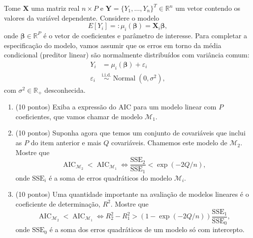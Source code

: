 \documentclass[a4paper,10pt, notitlepage]{report}
\newif\ifanswers
\begin{document}
Tome $ \boldsymbol{X}$ uma matriz real $n \times P$ e $\boldsymbol{Y} = \{Y_1, \ldots, Y_n\}^T \in \mathbb{R}^n$ um vetor contendo os valores da variável dependente.
Considere o modelo 
\begin{equation*}
    E[Y_i] =: \mu_i(\boldsymbol{\beta}) = \boldsymbol{X}_i\boldsymbol{\beta},
\end{equation*}
onde $\boldsymbol{\beta} \in \mathbb{R}^{P}$ é o vetor de coeficientes e parâmetro de interesse.
Para completar a especificação do modelo, vamos assumir que os erros em torno da média condicional (preditor linear) são normalmente distribuídos com variância comum:
\begin{align*}
    Y_i &= \mu_i(\boldsymbol{\beta}) + \varepsilon_i\\
    \varepsilon_i &\overset{\text{i.i.d.}}{\sim}  \operatorname{Normal}(0, \sigma^2),
\end{align*}
com $\sigma^2 \in \mathbb{R}_+$ desconhecida.

\begin{enumerate}[label=\alph*)]
 \item (10 pontos) Exiba a expressão do AIC para um modelo linear com $P$ coeficientes, que vamos chamar de modelo $\mathcal{M}_1$.
 \item (10 pontos)  Suponha agora que  temos um conjunto de   covariáveis que inclui as $P$ do item anterior e mais $Q$ covariáveis.
 Chamemos este modelo de $\mathcal{M}_2$.
 Mostre que
 \begin{equation*}
     \operatorname{AIC}_{\mathcal{M}_2} < \operatorname{AIC}_{\mathcal{M}_1} \iff \frac{\text{SSE}_2}{\text{SSE}_1} < \exp\left(-2Q/n\right),
 \end{equation*}
 onde $\text{SSE}_i$ é a soma de erros quadráticos do modelo $\mathcal{M}_i$.
 \item (10 pontos) Uma quantidade importante na avaliação de modelos lineares é o coeficiente de determinação, $R^2$.
 Mostre que 
  \begin{equation*}
     \operatorname{AIC}_{\mathcal{M}_2} < \operatorname{AIC}_{\mathcal{M}_1} \iff R_{2}^2 - R_{1}^2 > \left(1 - \exp\left(-2Q/n\right)\right) \frac{\text{SSE}_1}{\text{SSE}_0},
 \end{equation*}
 onde $\text{SSE}_0$ é a soma dos erros quadráticos de um modelo só com intercepto.
 \end{enumerate}

\ifanswers

\fi

% 
% 
\end{document}
